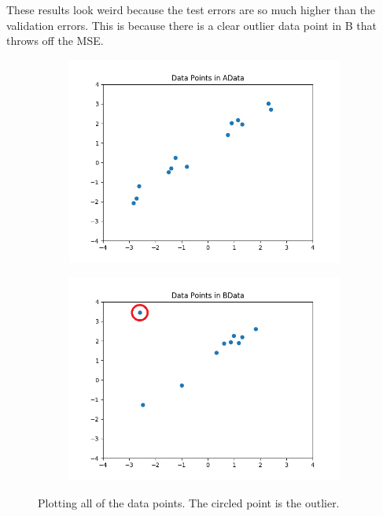 \documentclass{article}
\begin{document}
These results look weird because the test errors are so much higher than the validation errors. This is because there is a clear outlier data point in B that throws off the MSE.

\begin{figure}[H]
\centering
        \begin{subfigure}[b]{0.4\textwidth}
                \includegraphics[width=\linewidth]{../P3/figs/A_data.png}
        \end{subfigure}%
        \begin{subfigure}[b]{0.4\textwidth}
                \includegraphics[width=\linewidth]{../P3/figs/B_data.png}
        \end{subfigure}%
  \caption*{Plotting all of the data points. The circled point is the outlier.}
\end{figure}
\end{document}
